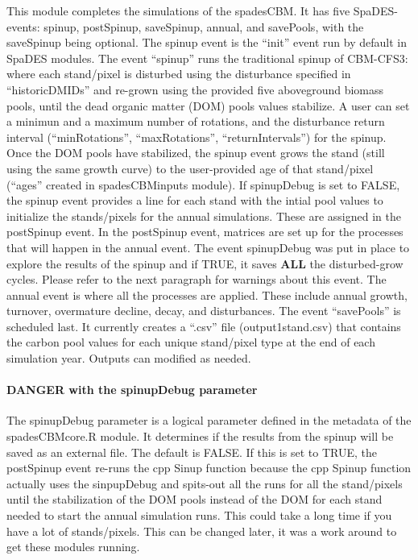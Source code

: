 \documentclass[]{article}
\let\oldparagraph\paragraph
\renewcommand{\paragraph}[1]{\oldparagraph{#1}\mbox{}}
\begin{document}
This module completes the simulations of the spadesCBM. It has five
SpaDES-events: spinup, postSpinup, saveSpinup, annual, and savePools,
with the saveSpinup being optional. The spinup event is the ``init''
event run by default in SpaDES modules. The event ``spinup'' runs the
traditional spinup of CBM-CFS3: where each stand/pixel is disturbed
using the disturbance specified in ``historicDMIDs'' and re-grown using
the provided five aboveground biomass pools, until the dead organic
matter (DOM) pools values stabilize. A user can set a minimun and a
maximum number of rotations, and the disturbance return interval
(``minRotations'', ``maxRotations'', ``returnIntervals'') for the
spinup. Once the DOM pools have stabilized, the spinup event grows the
stand (still using the same growth curve) to the user-provided age of
that stand/pixel (``ages'' created in spadesCBMinputs module). If
spinupDebug is set to FALSE, the spinup event provides a line for each
stand with the intial pool values to initialize the stands/pixels for
the annual simulations. These are assigned in the postSpinup event. In
the postSpinup event, matrices are set up for the processes that will
happen in the annual event. The event spinupDebug was put in place to
explore the results of the spinup and if TRUE, it saves \textbf{ALL} the
disturbed-grow cycles. Please refer to the next paragraph for warnings
about this event. The annual event is where all the processes are
applied. These include annual growth, turnover, overmature decline,
decay, and disturbances. The event ``savePools'' is scheduled last. It
currently creates a ``.csv'' file (output1stand.csv) that contains the
carbon pool values for each unique stand/pixel type at the end of each
simulation year. Outputs can modified as needed.

\paragraph{DANGER with the spinupDebug
parameter}\label{danger-with-the-spinupdebug-parameter}

The spinupDebug parameter is a logical parameter defined in the metadata
of the spadesCBMcore.R module. It determines if the results from the
spinup will be saved as an external file. The default is FALSE. If this
is set to TRUE, the postSpinup event re-runs the cpp Sinup function
because the cpp Spinup function actually uses the sinpupDebug and
spits-out all the runs for all the stand/pixels until the stabilization
of the DOM pools instead of the DOM for each stand needed to start the
annual simulation runs. This could take a long time if you have a lot of
stands/pixels. This can be changed later, it was a work around to get
these modules running.
\end{document}
